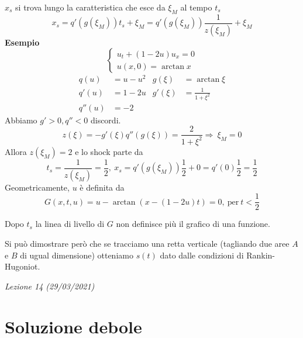 \documentclass[10pt,a4paper,twoside,openright]{book}
\begin{document}
$\displaystyle x_{s}$ si trova lungo la caratteristica che esce da $\displaystyle \xi _{M}$ al tempo $\displaystyle t_{s}$
\begin{equation*}
	x_{s} =q'( g( \xi _{M})) t_{s} +\xi _{M} =q'( g( \xi _{M}))\frac{1}{z( \xi _{M})} +\xi _{M}
\end{equation*}
\textbf{Esempio}
\begin{equation*}
	\begin{cases}
		u_{t} +( 1-2u) u_{x} =0 \\
		u( x,0) =\arctan x      
	\end{cases}
\end{equation*}
\begin{align*}
	q( u)   & =u-u^{2} & g( \xi )  & =\arctan \xi          \\
	q'( u)  & =1-2u    & g'( \xi ) & =\frac{1}{1+\xi ^{2}} \\
	q''( u) & =-2      &           &                       
\end{align*}
Abbiamo $\displaystyle g' >0,q''< 0$ discordi. 
\begin{equation*}
	z( \xi ) =-g'( \xi ) q''( g( \xi )) =\frac{2}{1+\xi ^{2}} \Rightarrow \ \xi _{M} =0
\end{equation*}
Allora $\displaystyle z( \xi _{M}) =2$ e lo shock parte da
\begin{equation*}
	t_{s} =\frac{1}{z( \xi _{M})} =\frac{1}{2} ,\ x_{s} =q'( g( \xi _{M}))\frac{1}{2} +0=q'( 0)\frac{1}{2} =\frac{1}{2}
\end{equation*}
Geometricamente, $\displaystyle u$ è definita da 
\begin{equation*}
	G( x,t,u) =u-\arctan( x-( 1-2u) t) =0,\ \text{per} \ t< \frac{1}{2}
\end{equation*}


Dopo $\displaystyle t_{s}$ la linea di livello di $\displaystyle G$ non definisce più il grafico di una funzione.

Si può dimostrare però che se tracciamo una retta verticale (tagliando due aree $\displaystyle A$ e $\displaystyle B$ di ugual dimensione) otteniamo $\displaystyle s( t)$ dato dalle condizioni di Rankin-Hugoniot.


\textit{Lezione 14 (29/03/2021)}
\section{Soluzione debole}
\end{document}
